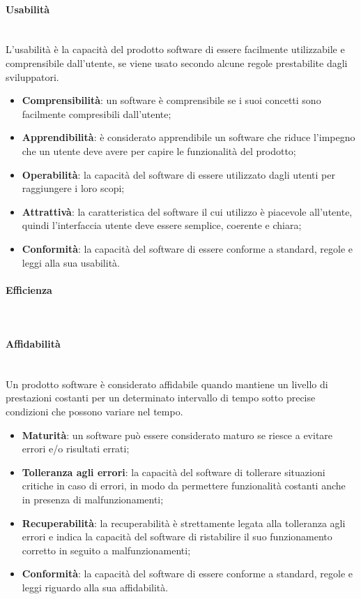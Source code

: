 	\paragraph{Usabilità} \mbox{}\\
	L'usabilità è la capacità del prodotto software di essere facilmente utilizzabile e comprensibile dall'utente, se viene usato secondo alcune regole prestabilite dagli sviluppatori.
	\begin{itemize}
		\item \textbf{Comprensibilità}: un software è comprensibile se i suoi concetti sono facilmente compresibili dall'utente;
		\item \textbf{Apprendibilità}: è considerato apprendibile un software che riduce l'impegno che un utente deve avere per capire le funzionalità del prodotto;
		\item \textbf{Operabilità}: la capacità del software di essere utilizzato dagli utenti per raggiungere i loro scopi;
		\item \textbf{Attrattivà}: la caratteristica del software il cui utilizzo è piacevole all'utente, quindi l'interfaccia utente deve essere semplice, coerente e chiara;
		\item \textbf{Conformità}: la capacità del software di essere conforme a standard, regole e leggi alla sua usabilità.
	\end{itemize}
	\paragraph{Efficienza} \mbox{}\\
	\begin{itemize}
	\end{itemize}
	\paragraph{Affidabilità} \mbox{}\\
	Un prodotto software è considerato affidabile quando mantiene un livello di prestazioni costanti per un determinato intervallo di tempo sotto precise condizioni che possono variare nel tempo.
	\begin{itemize}
		\item \textbf{Maturità}: un software può essere considerato maturo se riesce a evitare errori e/o risultati errati;
		\item \textbf{Tolleranza agli errori}: la capacità del software di tollerare situazioni critiche in caso di errori, in modo da permettere funzionalità costanti anche in presenza di malfunzionamenti;
		\item \textbf{Recuperabilità}: la recuperabilità è strettamente legata alla tolleranza agli errori e indica la capacità del software di ristabilire il suo funzionamento corretto in seguito a malfunzionamenti;
		\item \textbf{Conformità}: la capacità del software di essere conforme a standard, regole e leggi riguardo alla sua affidabilità.
	\end{itemize}
